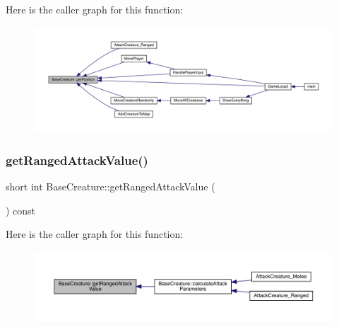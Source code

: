 Here is the caller graph for this function\+:
\nopagebreak
\begin{figure}[H]
\begin{center}
\leavevmode
\includegraphics[width=350pt]{class_base_creature_a00ebdc186dd6d3c0ef3c3d1262d4363f_icgraph}
\end{center}
\end{figure}
\mbox{\label{class_base_creature_a58a174420d25df7d0865087586c66a21}} 
\subsubsection{\texorpdfstring{get\+Ranged\+Attack\+Value()}{getRangedAttackValue()}}
{\footnotesize\ttfamily short int Base\+Creature\+::get\+Ranged\+Attack\+Value (\begin{DoxyParamCaption}{ }\end{DoxyParamCaption}) const}

Here is the caller graph for this function\+:
\nopagebreak
\begin{figure}[H]
\begin{center}
\leavevmode
\includegraphics[width=350pt]{class_base_creature_a58a174420d25df7d0865087586c66a21_icgraph}
\end{center}
\end{figure}
\mbox{\label{class_base_creature_a1232a2ecb3199fe79627df912078f24e}} 
